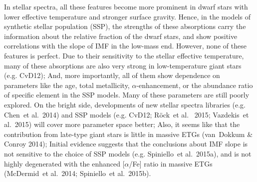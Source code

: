 \documentclass[preprint]{aastex}
\def\etal{{\ et al.~}}
\begin{document}
\begin{CJK*}{UTF8}{gbsn}
  In stellar spectra, all these features become more prominent in dwarf stars 
  with lower effective temperature and stronger surface gravity.  Hence, in 
  the models of synthetic stellar population (SSP), the strengths of these 
  absorptions carry the information about the relative fraction of the dwarf 
  stars, and show positive correlations with the slope of IMF in the low-mass
  end.  However, none of these features is perfect.  Due to their sensitivity
  to the stellar effective temperature, many of these absorptions are also 
  very strong in low-temperature giant stars (e.g. CvD12); And, more 
  importantly, all of them show dependence on parameters like the age, total
  metallicity, $\alpha$-enhancement, or the abundance ratio of specific 
  element in the SSP models.  Many of these parameters are still poorly 
  explored.  On the bright side, developments of new stellar spectra 
  libraries (e.g. Chen\etal 2014) and SSP models (e.g. CvD12; R{\"o}ck\etal 
  2015; Vazdekis\etal 2015) will cover more parameter space better; Also, it 
  seems like that the contribution from late-type giant stars is little in 
  massive ETGs (van~Dokkum \& Conroy 2014); Initial evidence suggests that 
  the conclusions about IMF slope is not sensitive to the choice of SSP 
  models (e.g. Spiniello\etal 2015a), and is not highly degenerated with 
  the enhanced [$\alpha$/Fe] ratio in massive ETGs (McDermid\etal 2014; 
  Spiniello\etal 2015b).  


\end{CJK*}
\end{document}
